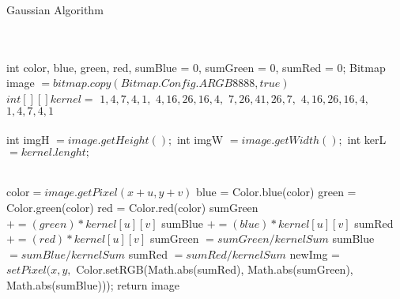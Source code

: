 \documentclass[11pt]{article}
\begin{document}
\begin{algorithm}
   \caption{Gaussian Algorithm}
    \begin{algorithmic}[1]
      \\
		\\
        \State int color, blue, green, red, sumBlue = 0, sumGreen = 0,				 \State sumRed = 0;
        \State  Bitmap image $= bitmap.copy(Bitmap.Config.ARGB8888, true)$
\\
		\State $int[ ][ ] kernel =$
          \State ${1, 4, 7, 4, 1},$
          \State ${4, 16, 26, 16, 4},$
                        \State ${7, 26, 41, 26, 7},$
                       \State $ {4, 16, 26, 16, 4},$
                        \State ${1, 4, 7, 4, 1} $
                        \\
                        \\
         \State int imgH $= image.getHeight(); $
        \State int imgW $= image.getWidth(); $
       \State int kerL $= kernel.lenght; $
        
\\
						\State color$= image.getPixel(x+u,y+v)$
						\State blue = Color.blue(color)
            				\State green = Color.green(color)
            				\State red = Color.red(color)
            				\State sumGreen $+= (green)*kernel[u][v]$
            				\State sumBlue $+= (blue)*kernel[u][v]$
            				\State sumRed $+= (red)*kernel[u][v]$
            			\EndFor
				\EndFor
				\State sumGreen $=sumGreen/kernelSum$
				\State sumBlue $=sumBlue/kernelSum$
				\State sumRed $=sumRed/kernelSum$
				\State newImg = $ setPixel(x, y, $				
				\State Color.setRGB(Math.abs(sumRed), 
				\State Math.abs(sumGreen), Math.abs(sumBlue)));
        		\EndFor
        \EndFor
        \State return image
       \EndFunction

\end{algorithmic}
\end{algorithm}
\end{document}
